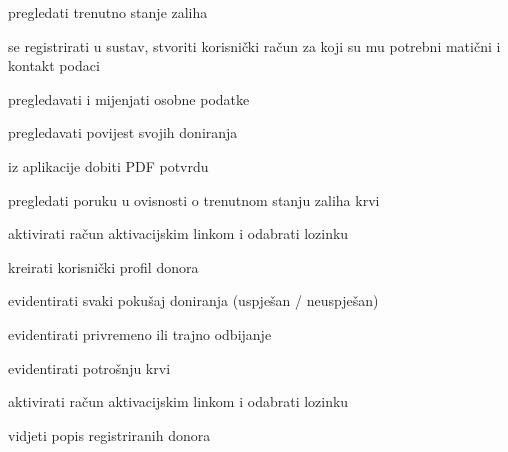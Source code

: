 \begin{packed_enum}
	\item  {}
	
	\begin{packed_enum}
		
		\item pregledati trenutno stanje zaliha
		\item se registrirati u sustav, stvoriti korisnički račun za koji su mu potrebni matični i kontakt podaci
		
	\end{packed_enum}
	
	\item  {}
	
	\begin{packed_enum}
		
		\item pregledavati i mijenjati osobne podatke
		\item pregledavati povijest svojih doniranja
		\item iz aplikacije dobiti PDF potvrdu
		\item pregledati poruku u ovisnosti o trenutnom stanju zaliha krvi
		\item aktivirati račun aktivacijskim linkom i odabrati lozinku
		
	\end{packed_enum}
	
	\item  {}
	
	\begin{packed_enum}
		
		\item kreirati korisnički profil donora
		\item evidentirati svaki pokušaj doniranja (uspješan / neuspješan) 
		\item evidentirati privremeno ili trajno odbijanje
		\item evidentirati potrošnju krvi 
		\item aktivirati račun aktivacijskim linkom i odabrati lozinku
		\item vidjeti popis registriranih donora
		
	\end{packed_enum}
	\eject
	
	\item  {}
	

\end{packed_enum}
